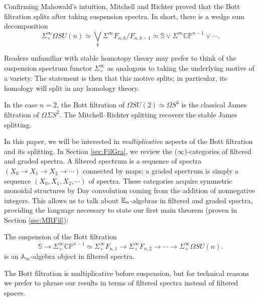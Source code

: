 Confirming Mahowald's intuition, Mitchell and Richter \cite[Theorem 2.1]{CrabbMitchell} proved that the Bott filtration splits after taking suspension spectra.  In short, there is a wedge sum decomposition
$$\Sigma^{\infty}_+ \Omega SU(n) \simeq \bigvee_k \Sigma^{\infty} F_{n,k}/F_{n,k-1} \simeq \mathbb{S} \vee \Sigma^{\infty} \mathbb{CP}^{n-1} \vee \cdots.$$

\begin{rmk}
Readers unfamiliar with stable homotopy theory may prefer to think of the suspension spectrum functor $\Sigma^\infty_+$ as analogous to taking the underlying motive of a variety.  The statement is then that this motive splits; in particular, its homology will split in any homology theory.  
\end{rmk}

\begin{exm}
In the case $n=2$, the Bott filtration of $\Omega SU(2) \simeq \Omega S^3$ is the classical James filtration of $\Omega \Sigma S^2$.  The Mitchell--Richter splitting recovers the stable James splitting.
\end{exm}

In this paper, we will be interested in \emph{multiplicative} aspects of the Bott filtration and its splitting.  In Section \ref{sec:FilGra}, we review the ($\infty$)-categories of filtered and graded spectra.  A filtered spectrum is a sequence of spectra $(X_0 \to X_1 \to X_2 \to \cdots)$ connected by maps; a graded spectrum is simply a sequence $(X_0,X_1,X_2,\cdots)$ of spectra.  These categories acquire symmetric monoidal structures by Day convolution coming from the addition of nonnegative integers.  This allows us to talk about $\operatorname{\mathbb{E}}_n$-algebras in filtered and graded spectra, providing the language necessary to state our first main theorem (proven in Section \ref{sec:MRFil}):

\begin{thm} \label{thm:BottIsAoo}
The suspension of the Bott filtration 
$$\mathbb{S} \longrightarrow \Sigma_+^{\infty} \mathbb{CP}^{n-1} \simeq \Sigma_+^{\infty} F_{n,1} \longrightarrow \Sigma_+^{\infty} F_{n,2} \longrightarrow \cdots \longrightarrow \Sigma^{\infty}_+ \Omega SU(n).$$
is an $\mathbb{A}_\infty$-algebra object in filtered spectra.
\end{thm}

\begin{rmk}
The Bott filtration is multiplicative before suspension, but for technical reasons we prefer to phrase our results in terms of filtered spectra instead of filtered spaces.
\end{rmk}

